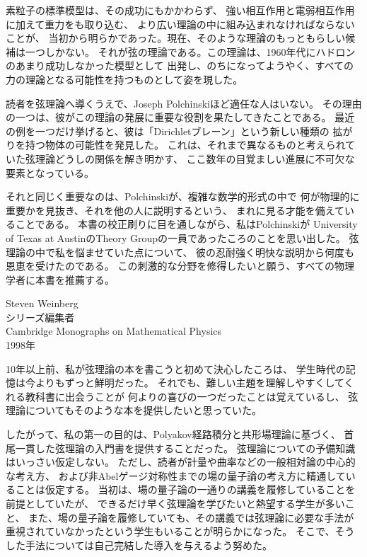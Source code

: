 \clearpage
{}
素粒子の標準模型は、その成功にもかかわらず、
強い相互作用と電弱相互作用に加えて重力をも取り込む、
より広い理論の中に組み込まれなければならないことが、
当初から明らかであった。現在、そのような理論のもっともらしい候補は一つしかない。
それが弦の理論である。この理論は、1960年代にハドロンのあまり成功しなかった模型として
出発し、のちになってようやく、すべての力の理論となる可能性を持つものとして姿を現した。

読者を弦理論へ導くうえで、Joseph Polchinskiほど適任な人はいない。
その理由の一つは、彼がこの理論の発展に重要な役割を果たしてきたことである。
最近の例を一つだけ挙げると、彼は「Dirichletブレーン」という新しい種類の
拡がりを持つ物体の可能性を発見した。
これは、それまで異なるものと考えられていた弦理論どうしの関係を解き明かす、
ここ数年の目覚ましい進展に不可欠な要素となっている。

それと同じく重要なのは、Polchinskiが、複雑な数学的形式の中で
何が物理的に重要かを見抜き、それを他の人に説明するという、
まれに見る才能を備えていることである。
本書の校正刷りに目を通しながら、私はPolchinskiが
University of Texas at AustinのTheory Groupの一員であったころのことを思い出した。
弦理論の中で私を悩ませていた点について、
彼の忍耐強く明快な説明から何度も恩恵を受けたのである。
この刺激的な分野を修得したいと願う、すべての物理学者に本書を推薦する。

\begin{flushright}
Steven Weinberg\\
シリーズ編集者\\
Cambridge Monographs on Mathematical Physics\\
1998年
\end{flushright}

\clearpage
{}
10年以上前、私が弦理論の本を書こうと初めて決心したころは、
学生時代の記憶は今よりもずっと鮮明だった。
それでも、難しい主題を理解しやすくしてくれる教科書に出会うことが
何よりの喜びの一つだったことは覚えているし、
弦理論についてもそのような本を提供したいと思っていた。

したがって、私の第一の目的は、Polyakov経路積分と共形場理論に基づく、
首尾一貫した弦理論の入門書を提供することだった。
弦理論についての予備知識はいっさい仮定しない。
ただし、読者が計量や曲率などの一般相対論の中心的な考え方、
および非Abelゲージ対称性までの場の量子論の考え方に精通していることは仮定する。
当初は、場の量子論の一通りの講義を履修していることを前提としていたが、
できるだけ早く弦理論を学びたいと熱望する学生が多いこと、
また、場の量子論を履修していても、その講義では弦理論に必要な手法が
重視されていなかったという学生もいることが明らかになった。
そこで、そうした手法については自己完結した導入を与えるよう努めた。

